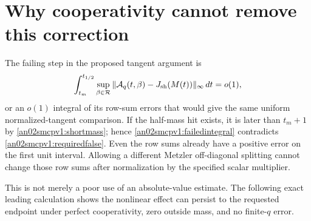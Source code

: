 \documentclass[11pt]{article}
\theoremstyle{remark}\newtheorem{remark}[theorem]{Remark}
\newcommand{\dd}{\,d}
\newcommand{\Rhalf}{\mathcal R}
\begin{document}
\section{Why cooperativity cannot remove this correction}
The failing step in the proposed tangent argument is
\begin{equation}\label{an02smcpv1:requiredfalse}
 \int_{t_m}^{t_{1/2}}\sup_{\beta\in\Rhalf}
 \|\mathcal A_q(t,\beta)-J_{\rm sh}(M(t))\|_\infty\dd t=o(1),
\end{equation}
or an $o(1)$ integral of its row-sum errors that would give the
same uniform normalized-tangent comparison. If the half-mass
hit exists, it is later than $t_m+1$ by
\eqref{an02smcpv1:shortmass}; hence
\eqref{an02smcpv1:failedintegral} contradicts
\eqref{an02smcpv1:requiredfalse}. Even the row sums already
have a positive error on the first unit interval. Allowing a
different Metzler off-diagonal splitting cannot change those
row sums after normalization by the specified scalar multiplier.

This is not merely a poor use of an absolute-value estimate.
The following exact leading calculation shows the nonlinear
effect can persist to the requested endpoint under perfect
cooperativity, zero outside mass, and no finite-$q$ error.
\end{document}
